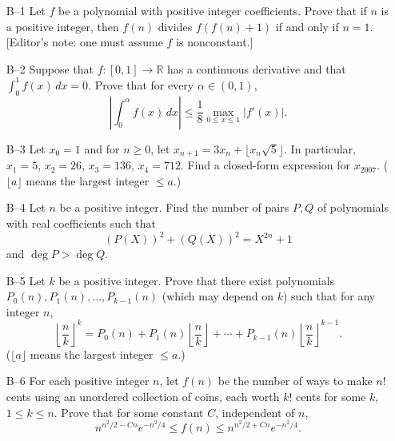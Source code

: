\documentclass[amssymb,twocolumn,pra,10pt,aps]{revtex4-1}
\begin{document}
\begin{itemize}
\item[B--1]
Let $f$ be a polynomial with positive integer coefficients. Prove
that if $n$ is a positive integer, then $f(n)$ divides $f(f(n)+1)$ if
and only if $n=1$. [Editor's note: one must assume $f$ is nonconstant.]

\item[B--2]
Suppose that $f: [0,1] \to \mathbb{R}$ has a continuous derivative
and that $\int_0^1 f(x)\,dx = 0$. Prove that for every $\alpha \in (0,1)$,
\[
\left| \int_0^\alpha f(x)\,dx \right| \leq \frac{1}{8} \max_{0 \leq x
\leq 1} |f'(x)|.
\]

\item[B--3]
Let $x_0 = 1$ and for $n \geq 0$, let $x_{n+1} = 3x_n + \lfloor x_n
\sqrt{5} \rfloor$. In particular, $x_1 = 5$, $x_2 = 26$, $x_3 = 136$,
$x_4 = 712$. Find a closed-form expression for $x_{2007}$. ($\lfloor a
\rfloor$ means the largest integer $\leq a$.)

\item[B--4]
Let $n$ be a positive integer. Find the number of pairs $P, Q$ of
polynomials with real coefficients such that
\[
(P(X))^2 + (Q(X))^2 = X^{2n} + 1
\]
and $\deg P > \deg Q$.

\item[B--5]
Let $k$ be a positive integer. Prove that there exist polynomials
$P_0(n), P_1(n), \dots, P_{k-1}(n)$ (which may depend on $k$) such that
for any integer $n$,
\[
\left\lfloor \frac{n}{k} \right\rfloor^k = P_0(n) + P_1(n) \left\lfloor
\frac{n}{k} \right\rfloor + \cdots + P_{k-1}(n) \left\lfloor \frac{n}{k}
\right\rfloor^{k-1}.
\]
($\lfloor a \rfloor$ means the largest integer $\leq a$.)

\item[B--6]
For each positive integer $n$, let $f(n)$ be the number of ways to
make $n!$ cents using an unordered collection of coins, each worth $k!$
cents for some $k$, $1 \leq k \leq n$. Prove that for some constant $C$,
independent of $n$,
\[
n^{n^2/2 - Cn} e^{-n^2/4} \leq f(n) \leq n^{n^2/2 + Cn}e^{-n^2/4}.
\]

\end{itemize}
\end{document}
